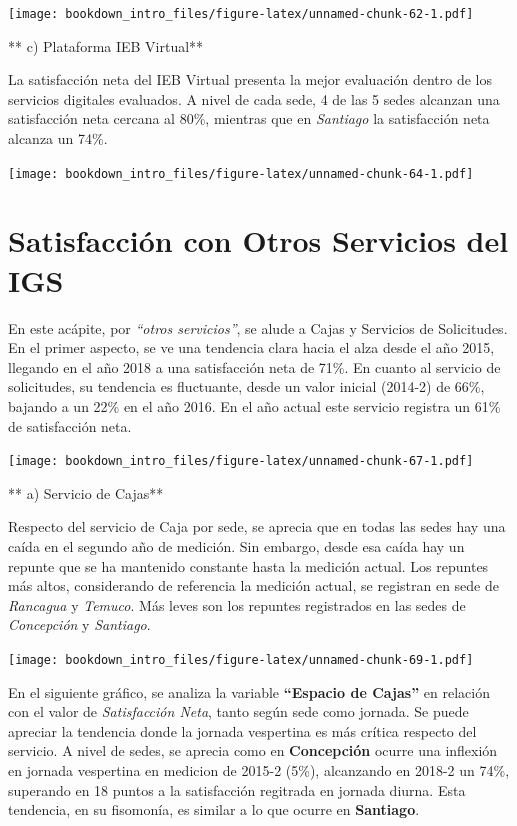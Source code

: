 \documentclass[]{book}
\begin{document}
\texttt{[image: bookdown\_intro\_files/figure-latex/unnamed-chunk-62-1.pdf]}

** c) Plataforma IEB Virtual**

La satisfacción neta del IEB Virtual presenta la mejor evaluación dentro
de los servicios digitales evaluados. A nivel de cada sede, 4 de las 5
sedes alcanzan una satisfacción neta cercana al 80\%, mientras que en
\emph{Santiago} la satisfacción neta alcanza un 74\%.

\texttt{[image: bookdown\_intro\_files/figure-latex/unnamed-chunk-64-1.pdf]}

\section{Satisfacción con Otros Servicios del
IGS}\label{satisfaccion-con-otros-servicios-del-igs}

En este acápite, por \emph{``otros servicios''}, se alude a Cajas y
Servicios de Solicitudes. En el primer aspecto, se ve una tendencia
clara hacia el alza desde el año 2015, llegando en el año 2018 a una
satisfacción neta de 71\%. En cuanto al servicio de solicitudes, su
tendencia es fluctuante, desde un valor inicial (2014-2) de 66\%,
bajando a un 22\% en el año 2016. En el año actual este servicio
registra un 61\% de satisfacción neta.

\texttt{[image: bookdown\_intro\_files/figure-latex/unnamed-chunk-67-1.pdf]}

** a) Servicio de Cajas**

Respecto del servicio de Caja por sede, se aprecia que en todas las
sedes hay una caída en el segundo año de medición. Sin embargo, desde
esa caída hay un repunte que se ha mantenido constante hasta la medición
actual. Los repuntes más altos, considerando de referencia la medición
actual, se registran en sede de \emph{Rancagua} y \emph{Temuco}. Más
leves son los repuntes registrados en las sedes de \emph{Concepción} y
\emph{Santiago}.

\texttt{[image: bookdown\_intro\_files/figure-latex/unnamed-chunk-69-1.pdf]}

En el siguiente gráfico, se analiza la variable \textbf{``Espacio de
Cajas''} en relación con el valor de \emph{Satisfacción Neta}, tanto
según sede como jornada. Se puede apreciar la tendencia donde la jornada
vespertina es más crítica respecto del servicio. A nivel de sedes, se
aprecia como en \textbf{Concepción} ocurre una inflexión en jornada
vespertina en medicion de 2015-2 (5\%), alcanzando en 2018-2 un 74\%,
superando en 18 puntos a la satisfacción regitrada en jornada diurna.
Esta tendencia, en su fisomonía, es similar a lo que ocurre en
\textbf{Santiago}.
\end{document}
